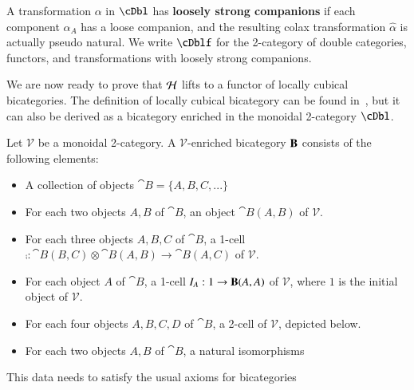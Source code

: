 \begin{defn}
  A transformation $\alpha$ in $\cDbl$ has \textbf{loosely strong companions} if each component $\alpha_A$ has a loose companion, and the resulting colax transformation $\hat\alpha$ is actually pseudo natural.
  We write $\cDblf$ for the 2-category of double categories, functors, and transformations with loosely strong companions.
\end{defn}

We are now ready to prove that $\mathcal{H}$ lifts to a functor of locally cubical bicategories. The definition of locally cubical bicategory can be found in~\cite{gg:ldstr-tricat}, but it can also be derived as a bicategory enriched in the monoidal 2-category $\cDbl$.

\begin{defn}
Let $\mathcal{V}$ be a monoidal 2-category. A $\mathcal{V}$-enriched bicategory ${\bf B}$ consists of the following elements:
\begin{itemize}
\item A collection of objects $\cat{B}=\{A,B,C,...\} $
\item For each two objects $A,B$ of $\cat{B}$, an object ${\cat B}(A,B)$ of $\mathcal{V}$. 
\item For each three objects $A, B, C$ of $\cat{B}$, a 1-cell  $\comp: {\cat B}(B,C) \otimes {\cat B}(A,B) \rightarrow {\cat B}(A,C)$ of $\mathcal{V}$. 
\item For each object $A$ of $\cat{B}$, a 1-cell $I_A: 1 \rightarrow {\bf B}(A,A)$ of $\mathcal{V}$, where $1$ is the initial object of $\mathcal{V}$. 
\item For each four objects $A,B,C,D$ of $\cat{B}$, a 2-cell of $\mathcal{V}$, depicted below. 
  \begin{center}
    
    \end{center}
\item For each two objects $A,B$ of $\cat{B}$, a natural isomorphisms 
  \begin{center}
    
    \end{center}
 \end{itemize}
This data needs to satisfy the usual axioms for bicategories~\cite{maclane}
\end{defn}

